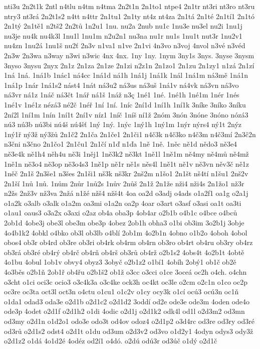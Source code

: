 {nti3u
2n2t1k
2ntl
n4tlu
n4tm
n4tma
2n2t1n
2n1to1
ntpe4
2n1tr
nt3ri
nt3ro
nt3ru
ntry3
nt3rá
2n2t1s2
n4tt
n4ttr
2n1tu1
2n1ty
nt4z
nt4za
2n1tá
2n1té
2n1tí1
2n1tó
2n1tý
2n1tě1
n2tš2
2n2tů
1n2u1
1nu.
nu2a
2nub
nu1c
1nu3e
nu3el
nu2i
1nu1j
nu3je
nu4k
nu4k3l
1nu1l
1nu1m
n2u2n1
nu3na
nu1r
nu1s
1nu1t
nut3r
1nu2v1
nu4zn
1nu2á
1nu1š
nu2ť
2n3v
n1va1
n1ve
2n1vi
4n3vo
n3voj
4nvol
n3vé
n3véd
2n3w
2n3wa
n3way
n3wi
n3wic
4nx
4nx.
1ny
1ny.
1nym
3ny1s
3nys.
3nyse
3nysm
3nyso
3nysu
2nyx
2n1z
2n1za
2n1ze
2n1zi
n2z1n
2n1zo1
2n1zu
2n1zy1
n1zá
2n1zí
1ná
1ná.
1ná1b
1nác1
ná4cc
1ná1d
ná1h
1ná1j
1ná1k
1nál
1ná1m
ná3mě
1ná1n
1ná1p
1nár
1ná1s2
nást4
1nát
ná3u2
ná3us
ná3uš
1ná1v
ná4vk
ná3vn
ná3vo
ná3vr
ná1z
1náč
ná3čt
1nář
ná1š
1náž
n3ç
1né1
1né.
1né1h
1né1m
1nér
1nés
1né1v
1né1z
nézá3
né2č
1néř
1ní
1ní.
1níc
2ní1d
1ní1h
1ní1k
3níke
3níko
3níku
2ní2l
1ní1m
1nín
1ní1t
2ní1v
níz1
1níč
1níš
ní1ž
2nóm
3nón
3nóne
3nóno
nózá3
nú3
nú3b
nú3bi
nú4š
nú4šť
1ný
1ný.
1nýc
1ný1h
1ný1m
1nýr
nýrs4
ný1t
2nýz
1ný1ř
ný3ž
ný3žů
2n1č2
2n1ča
2n1če1
2n1či1
n4č3k
n4č3ko
n4č3m
n4č3mí
2n3č2n
n3čni
n3čno
2n1čo1
2n1ču1
2n1čí
n1ď
n1ďa
1ně
1ně.
1něc
ně1d
nědo3
ně3e4
ně3e4k
ně1h4
něh4u
ně3i
1něj1
1ně3k2
ně3kt
1ně1l
1ně1m
ně4my
ně4mů
ně4mž
1ně1n
ně3o4
ně3op
ně3o4s3
1ně1p
ně1r
ně1s
něs4l
1ně1t
ně1v
ně3vn
něv3č
ně1z
1něč
2n1š
2n3še1
n3šes
2n1ši1
nš3k
nš3kr
2nš2m
n1šo1
2n1št
nš4tí
n1šu1
2nš2v
2n1ší
1nů
1nů.
1nům
2nůr
1nů2s
1nův
2nůš
2n1ž
2n1že
nži4
nži4s
2n1žo1
nž3r
n2žs
2nž3v
nž3va
2nžá
n1žé
nžš4
nžš4t
4oa
oa2d
o3adj
o4ads
o1a2f1
oa1g
o2a1j
o1a2k
o3alb
o3alk
o1a2m
oa3mi
o1a2n
oa2p
4oar
o3art
o3asf
o3asi
oa1t
oa3ti
o1au1
oaus3
o3a2x
o3axi
o2az
ob4a
oba3p
4ob4ar
o2b1b
o4b1c
o4bce
o4bců
2ob1d
4obe3j
obe3l
obe3m
obe3p
4obez
2ob1h
obha3
o1bi
ob3im
3o2b1j
3obje
4o4b1k2
4obkl
o4bko
ob3l
ob3lb
o4blí
2ob1m
4o2b1n
4obno
o1b2o
4oboh
4obol
obos4
ob3r
ob4rd
ob3re
ob3ri
ob4rk
ob4rm
ob4rn
ob3ro
ob4rt
ob4ru
ob3ry
ob4rz
ob3rá
ob3ré
ob4rý
ob4rč
ob4rň
ob4rš
ob3rů
ob4rž
o2b1s2
4obs4t
4o2b1t
4obtě
4o1bu
4obul
1ob1v
obvy4
obyz3
3obyč
o2b1z2
o1bí1
4obíh
2obý1
ob1č
ob2ě
4o3běs
o2b1ň
2ob1ř
ob4řu
o2b1š2
ob1ž
o3cc
o3cci
o1ce
3oceá
oc2h
o4ch.
o4chn
o3cht
o1ci
oci3c
ocio3
o3c4k3a
o3c4ke
ock3h
oc4kt
oc3le
o2cm
o2c1n
o1co
oc2p
oc3re
oc3ta
oct3l
oct3n
o4ctu
o1cu1
o1c2v
o1cy
ocy3k
o1cí
ocú3
ocú3n
oc1ň
o1da1
odad3
oda3e
o2d1b
o2d1c2
o2d1d2
3oddí
od2e
ode3e
ode3m
4oden
ode4o
ode3p
4odet
o2d1f
o2d1h2
o1di
4odic
o2d1j
o2d1k2
odk4l
od1l
o2d3m2
od3mn
od3my
o2d1n
o1d2o1
odo3e
odo3t
od4ov
odoz4
o2d1p2
o3d4rc
od3re
od3ry
od3ré
od3rů
o2d1s2
odst4
o2d1t
o1du
od3um
o2d3v2
od3vo
o1d2y1
4odyn
odys3
ody3ž
o2d1z2
o1dá
4o1d2é
4odéz
od2í1
o4dó.
o2dú
odú3r
od3úč
o1dý
o2d1č
}
